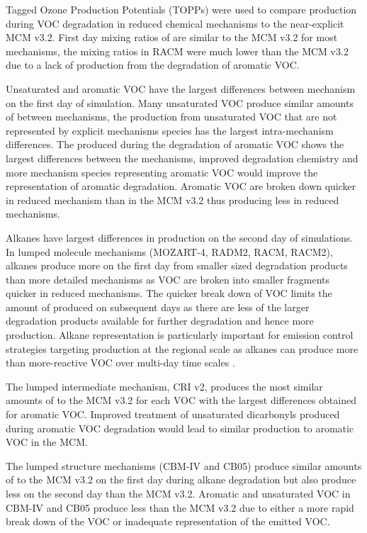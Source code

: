 Tagged Ozone Production Potentials (TOPPs) were used to compare  production during VOC degradation in reduced chemical mechanisms to the near-explicit MCM v3.2. 
First day mixing ratios of  are similar to the MCM v3.2 for most mechanisms, the  mixing ratios in RACM were much lower than the MCM v3.2 due to a lack of  production from the degradation of aromatic VOC.

Unsaturated and aromatic VOC have the largest differences between mechanism on the first day of simulation.
Many unsaturated VOC produce similar amounts of  between mechanisms, the  production from unsaturated VOC that are not represented by explicit mechanisms species has the largest intra-mechanism differences.
The  produced during the degradation of aromatic VOC shows the largest differences between the mechanisms, improved degradation chemistry and more mechanism species representing aromatic VOC would improve the representation of aromatic degradation.
Aromatic VOC are broken down quicker in reduced mechanism than in the MCM v3.2 thus producing less  in reduced mechanisms.

Alkanes have largest differences in  production on the second day of simulations.
In lumped molecule mechanisms (MOZART-4, RADM2, RACM, RACM2), alkanes produce more  on the first day from smaller sized degradation products than more detailed mechanisms as VOC are broken into smaller fragments quicker in reduced mechanisms.
The quicker break down of VOC limits the amount of  produced on subsequent days as there are less of the larger degradation products available for further degradation and hence more  production.
Alkane representation is particularly important for emission control strategies targeting  production at the regional scale as alkanes can produce more  than more-reactive VOC over multi-day time scales \citep{Butler:2011}.

The lumped intermediate mechanism, CRI v2, produces the most similar amounts of  to the MCM v3.2 for each VOC with the largest differences obtained for aromatic VOC.
Improved treatment of unsaturated dicarbonyls produced during aromatic VOC degradation would lead to similar  production to aromatic VOC in the MCM.

The lumped structure mechanisms (CBM-IV and CB05) produce similar amounts of  to the MCM v3.2 on the first day during alkane degradation but also produce less  on the second day than the MCM v3.2.
Aromatic and unsaturated VOC in CBM-IV and CB05 produce less  than the MCM v3.2 due to either a more rapid break down of the VOC or inadequate representation of the emitted VOC.

